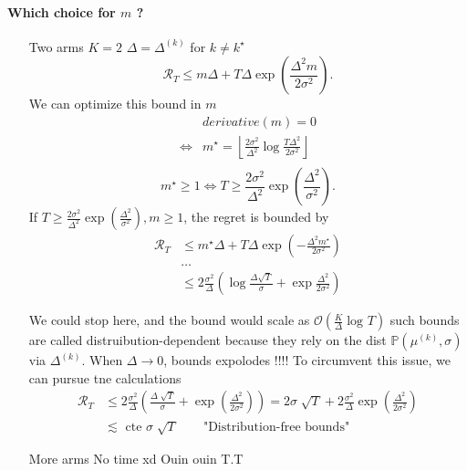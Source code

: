 \paragraph{Which choice for $ m $ ?}
\begin{itemize}
    \item [Two arms $ K = 2 $ ] $ \Delta = \Delta ^{(k)} $ for $ k \neq k^\star  $ 
    \[
        \mathcal{R}_T \leq m \Delta + T \Delta \exp (\frac{\Delta ^2 m }{2 \sigma ^2})
    .\]
    We can optimize this bound in $ m $ 
    \begin{align*}
            &derivative (m) = 0 \\
        \Leftrightarrow
            & m^\star = \left\lfloor \frac{2 \sigma ^2}{\Delta ^2} \log \frac{T \Delta ^2}{2 \sigma ^2}  \right\rfloor \\
    \end{align*}
    \[
        m ^\star \geq 1 \Leftrightarrow T \geq \frac{2 \sigma ^2}{\Delta ^2} \exp (\frac{\Delta ^2}{\sigma ^2})
    .\]
    If $ T \geq \frac{2 \sigma ^2}{\Delta ^2} \exp (\frac{\Delta ^2}{\sigma ^2}), m \geq 1 $, the regret is bounded by 
    \begin{align*}
        \mathcal{R}_T 
            &\leq m^\star \Delta + T \Delta \exp ( - \frac{\Delta ^2 m^\star }{2 \sigma ^2}) \\
            &\dots \\
            &\leq 2 \frac{\sigma ^2}{\Delta } (\log \frac{\Delta \sqrt{T} }{\sigma } + \exp \frac{\Delta ^2}{2 \sigma ^2} )
    \end{align*}
    
    We could stop here, and the bound would scale as $\mathcal{O}(\frac{K}{\Delta } \log_{}T )$ such bounds are called distruibution-dependent because they rely on the dist $\mathbb{P}(\mu^{(k)}, \sigma )$ via $\Delta ^{(k)}$. When $\Delta \to 0$, bounds expolodes !!!!
    To circumvent this issue, we can pursue tne calculations
    \begin{align*}
        \mathcal{R}_T &\leq  2 \frac{\sigma ^2}{\Delta }(\frac{\Delta \sqrt[]{T}}{\sigma } + \exp (\frac{\Delta ^2}{2 \sigma ^2}) ) = 2 \sigma \sqrt[]{T} + 2 \frac{\sigma ^2}{\Delta } \exp (\frac{\Delta ^2}{2 \sigma ^2}) \\
        & \lesssim \text{ cte } \sigma \sqrt[]{T} \qquad \text{"Distribution-free bounds"}
    \end{align*}
    
    \item [More arms] No time xd Ouin ouin T.T
\end{itemize}

